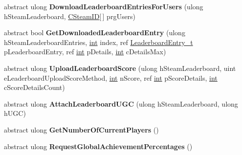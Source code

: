 \begin{DoxyCompactItemize}
\item 
\hypertarget{classValve_1_1Steamworks_1_1ISteamUserStats_a91330bf9851a99972fc3dc3862ad93bd}{}abstract ulong {\bfseries Download\+Leaderboard\+Entries\+For\+Users} (ulong h\+Steam\+Leaderboard, \hyperlink{structValve_1_1Steamworks_1_1CSteamID}{C\+Steam\+I\+D}\mbox{[}$\,$\mbox{]} prg\+Users)\label{classValve_1_1Steamworks_1_1ISteamUserStats_a91330bf9851a99972fc3dc3862ad93bd}

\item 
\hypertarget{classValve_1_1Steamworks_1_1ISteamUserStats_a12525701d48c9dbb6ad9ce1506812029}{}abstract bool {\bfseries Get\+Downloaded\+Leaderboard\+Entry} (ulong h\+Steam\+Leaderboard\+Entries, \hyperlink{SDL__thread_8h_a6a64f9be4433e4de6e2f2f548cf3c08e}{int} index, ref \hyperlink{structValve_1_1Steamworks_1_1LeaderboardEntry__t}{Leaderboard\+Entry\+\_\+t} p\+Leaderboard\+Entry, ref \hyperlink{SDL__thread_8h_a6a64f9be4433e4de6e2f2f548cf3c08e}{int} p\+Details, \hyperlink{SDL__thread_8h_a6a64f9be4433e4de6e2f2f548cf3c08e}{int} c\+Details\+Max)\label{classValve_1_1Steamworks_1_1ISteamUserStats_a12525701d48c9dbb6ad9ce1506812029}

\item 
\hypertarget{classValve_1_1Steamworks_1_1ISteamUserStats_a56683d4b3bd94ac504be596a0aa9f53d}{}abstract ulong {\bfseries Upload\+Leaderboard\+Score} (ulong h\+Steam\+Leaderboard, uint e\+Leaderboard\+Upload\+Score\+Method, \hyperlink{SDL__thread_8h_a6a64f9be4433e4de6e2f2f548cf3c08e}{int} n\+Score, ref \hyperlink{SDL__thread_8h_a6a64f9be4433e4de6e2f2f548cf3c08e}{int} p\+Score\+Details, \hyperlink{SDL__thread_8h_a6a64f9be4433e4de6e2f2f548cf3c08e}{int} c\+Score\+Details\+Count)\label{classValve_1_1Steamworks_1_1ISteamUserStats_a56683d4b3bd94ac504be596a0aa9f53d}

\item 
\hypertarget{classValve_1_1Steamworks_1_1ISteamUserStats_a4dd6c69ecd1938012d5c4212449a1a43}{}abstract ulong {\bfseries Attach\+Leaderboard\+U\+G\+C} (ulong h\+Steam\+Leaderboard, ulong h\+U\+G\+C)\label{classValve_1_1Steamworks_1_1ISteamUserStats_a4dd6c69ecd1938012d5c4212449a1a43}

\item 
\hypertarget{classValve_1_1Steamworks_1_1ISteamUserStats_aa8991a0350ab3df42a64a93c19858a4c}{}abstract ulong {\bfseries Get\+Number\+Of\+Current\+Players} ()\label{classValve_1_1Steamworks_1_1ISteamUserStats_aa8991a0350ab3df42a64a93c19858a4c}

\item 
\hypertarget{classValve_1_1Steamworks_1_1ISteamUserStats_a396c8e2e69d2479f702a8a9b222a9d57}{}abstract ulong {\bfseries Request\+Global\+Achievement\+Percentages} ()\label{classValve_1_1Steamworks_1_1ISteamUserStats_a396c8e2e69d2479f702a8a9b222a9d57}


\end{DoxyCompactItemize}
